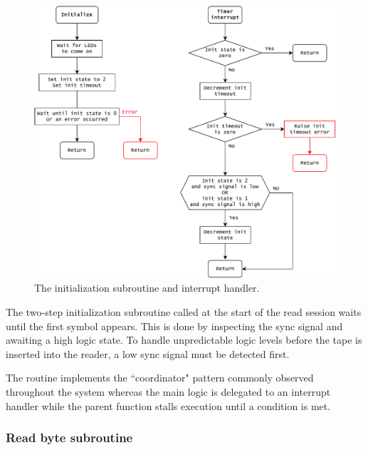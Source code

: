 \documentclass{article}
\begin{document}
	\begin{figure}[h]
		\includegraphics[width=\linewidth]{img/init}
		\caption{The initialization subroutine and interrupt handler.}
	\end{figure}
	
	The two-step initialization subroutine called at the start of the read
	session waits until the first symbol appears. This is done by inspecting
	the sync signal and awaiting a high logic state. To handle unpredictable
	logic levels before the tape is inserted into the reader, a low sync signal
	must be detected first.
	
	The routine implements the ``coordinator" pattern commonly observed
	throughout the system whereas the main logic is delegated to an interrupt
	handler while the parent function stalls execution until a condition is
	met.
	
	\newpage
	\subsubsection{Read byte subroutine}
	
\end{document}
